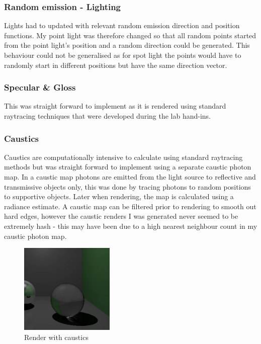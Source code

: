 \documentclass{article}
\begin{document}
\subsubsection{Random emission - Lighting}
Lights had to updated with relevant random emission direction and position functions. My point light was therefore changed so that all random points started from the point light's position and a random direction could be generated. This behaviour could not be generalised as for spot light the points would have to randomly start in different positions but have the same direction vector.

\subsubsection{Specular \& Gloss}
This was straight forward to implement as it is rendered using standard raytracing techniques that were developed during the lab hand-ins. 

\subsubsection{Caustics}
Caustics are computationally intensive to calculate using standard raytracing methods but was straight forward to implement using a separate caustic photon map. In a caustic map photons are emitted from the light source to reflective and transmissive objects only, this was done by tracing photons to random positions to supportive objects. Later when rendering, the map is calculated using a radiance estimate. A caustic map can be filtered prior to rendering to smooth out hard edges, however the caustic renders I was generated never seemed to be extremely hash - this may have been due to a high nearest neighbour count in my caustic photon map.

\begin{figure}[h]
\centering
\includegraphics[width=0.4\textwidth]{caustics}
\captionsetup{justification=centering,margin=0.5cm}
\caption{Render with caustics}
\label{fig:caustics}
\end{figure}
\end{document}
